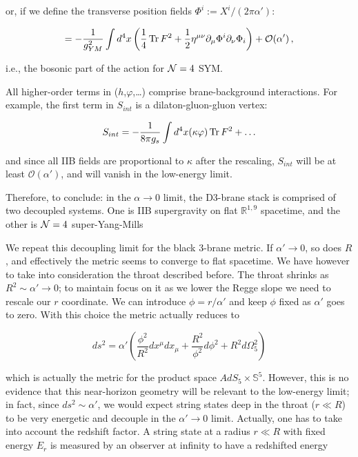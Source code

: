 or, if we define the transverse position fields $\Phi^i := X^i / (2\pi\alpha')$:

\begin{equation}
	= - \frac{1}{g_{YM}^2} \int d^4 x \left( \frac{1}{4} \operatorname{Tr} F^2 + \frac{1}{2} \eta^{\mu\nu} \partial_\mu \Phi^i \partial_\nu \Phi_i \right) + \mathcal{O}(\alpha')\,,
	\label{}
\end{equation}

i.e., the bosonic part of the action for $\mathcal{N} = 4$ SYM.

All higher-order terms in ($h$,$\varphi$,\ldots) comprise brane-background interactions. For example, the first term in $S_{int}$ is a dilaton-gluon-gluon vertex:

\begin{equation}
	S_{int} = - \frac{1}{8\pi g_s} \int d^4 x (\kappa \varphi) \operatorname{Tr} F^2 + \ldots
	\label{}
\end{equation}

and since all IIB fields are proportional to $\kappa$ after the rescaling, $S_{int}$ will be at least $\mathcal{O}(\alpha')$, and will vanish in the low-energy limit.

Therefore, to conclude: in the $\alpha \rightarrow 0$ limit, the D3-brane stack is comprised of two decoupled systems. One is IIB supergravity on flat $\mathbb{R}^{1,9}$ spacetime, and the other is $\mathcal{N}=4$ super-Yang-Mills

We repeat this decoupling limit for the black 3-brane metric. If $\alpha' \rightarrow 0$, so does $R$, and effectively the metric seems to converge to flat spacetime. We have however to take into consideration the throat described before. The throat shrinks as $R^2 \sim \alpha' \rightarrow 0$; to maintain focus on it as we lower the Regge slope we need to rescale our $r$ coordinate. We can introduce $\phi = r/\alpha'$ and keep $\phi$ fixed as $\alpha'$ goes to zero. With this choice the metric actually reduces to

\begin{equation}
	ds^2 = \alpha' \left( \frac{\phi^2 }{R^2}dx^\mu dx_\mu + \frac{R^2}{\phi^2} d\phi^2 + R^2 d\Omega_5^2 \right)
	\label{}
\end{equation}

which is actually the metric for the product space $AdS_5 \times \mathbb{S}^5$. However, this is no evidence that this near-horizon geometry will be relevant to the low-energy limit; in fact, since $ds^2 \sim \alpha'$, we would expect string states deep in the throat ($r \ll R$) to be very energetic and decouple in the $\alpha' \rightarrow 0$ limit. Actually, one has to take into account the redshift factor. A string state at a radius $r \ll R$ with fixed energy $E_r$ is measured by an observer at infinity to have a redshifted energy


